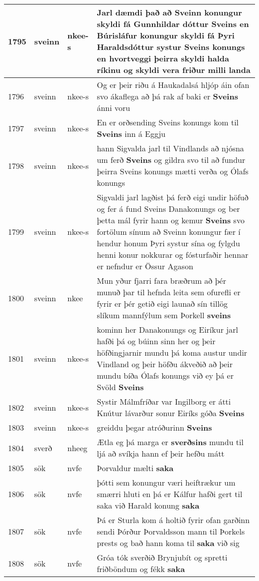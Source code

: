 \documentclass{article}
\begin{document}
\begin{longtable}{p{1cm}|p{1cm}|p{1cm}|p{13cm}}
1795&sveinn&nkee-s&Jarl dæmdi það að Sveinn konungur skyldi fá Gunnhildar dóttur \textbf{Sveins} en Búrisláfur konungur skyldi fá Þyri Haraldsdóttur systur Sveins konungs en hvortveggi þeirra skyldi halda ríkinu og skyldi vera friður milli landa\\
\hline
1796&sveinn&nkee-s&Og er þeir riðu á Haukadalsá hljóp áin ofan svo ákaflega að þá rak af baki er \textbf{Sveins} ánni voru\\
\hline
1797&sveinn&nkee-s&En er orðsending Sveins konungs kom til \textbf{Sveins} inn á Eggju\\
\hline
1798&sveinn&nkee-s&hann Sigvalda jarl til Vindlands að njósna um ferð \textbf{Sveins} og gildra svo til að fundur þeirra Sveins konungs mætti verða og Ólafs konungs\\
\hline
1799&sveinn&nkee-s&Sigvaldi jarl lagðist þá ferð eigi undir höfuð og fer á fund Sveins Danakonungs og ber þetta mál fyrir hann og kemur \textbf{Sveins} svo fortölum sínum að Sveinn konungur fær í hendur honum Þyri systur sína og fylgdu henni konur nokkurar og fósturfaðir hennar er nefndur er Össur Agason\\
\hline
1800&sveinn&nkee&Mun yður fjarri fara bræðrum að þér munuð þar til hefnda leita sem ofurefli er fyrir er þér getið eigi launað sín tillög slíkum mannfýlum sem Þorkell \textbf{sveins} \\
\hline
1801&sveinn&nkee-s&kominn her Danakonungs og Eiríkur jarl hafði þá og búinn sinn her og þeir höfðingjarnir mundu þá koma austur undir Vindland og þeir höfðu ákveðið að þeir mundu bíða Ólafs konungs við ey þá er Svöld \textbf{Sveins} \\
\hline
1802&sveinn&nkee-s&Systir Málmfríðar var Ingilborg er átti Knútur lávarður sonur Eiríks góða \textbf{Sveins} \\
\hline
1803&sveinn&nkee-s&greiddu þegar atróðurinn \textbf{Sveins} \\
\hline
1804&sverð&nheeg&Ætla eg þá marga er \textbf{sverðsins} mundu til ljá að svíkja hann ef þeir hefðu mátt\\
\hline
1805&sök&nvfe&Þorvaldur mælti \textbf{saka} \\
\hline
1806&sök&nvfe&þótti sem konungur væri heiftrækur um smærri hluti en þá er Kálfur hafði gert til saka við Harald konung \textbf{saka} \\
\hline
1807&sök&nvfe&Þá er Sturla kom á holtið fyrir ofan garðinn sendi Þórður Þorvaldsson mann til Þorkels prests og bað hann koma til \textbf{saka} við sig\\
\hline
1808&sök&nvfe&Gróa tók sverðið Brynjubít og spretti friðböndum og fékk \textbf{saka} \\

\end{longtable}
\end{document}
